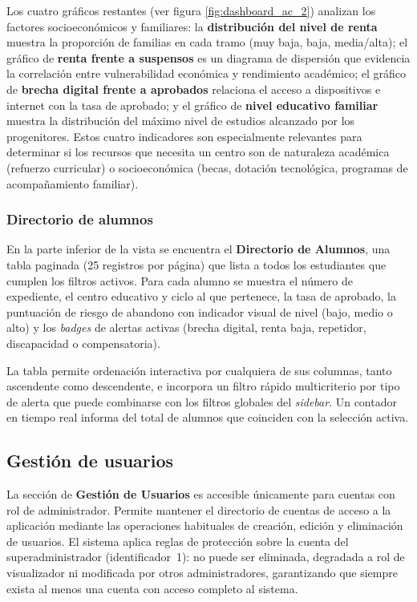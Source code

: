 Los cuatro gráficos restantes (ver figura \ref{fig:dashboard_ac_2}) analizan los factores socioeconómicos y familiares: la \textbf{distribución del nivel de renta} muestra la proporción de familias en cada tramo (muy baja, baja, media/alta); el gráfico de \textbf{renta frente a suspensos} es un diagrama de dispersión que evidencia la correlación entre vulnerabilidad económica y rendimiento académico; el gráfico de \textbf{brecha digital frente a aprobados} relaciona el acceso a dispositivos e internet con la tasa de aprobado; y el gráfico de \textbf{nivel educativo familiar} muestra la distribución del máximo nivel de estudios alcanzado por los progenitores. Estos cuatro indicadores son especialmente relevantes para determinar si los recursos que necesita un centro son de naturaleza académica (refuerzo curricular) o socioeconómica (becas, dotación tecnológica, programas de acompañamiento familiar).

\subsubsection{Directorio de alumnos}

En la parte inferior de la vista se encuentra el \textbf{Directorio de Alumnos}, una tabla paginada (25 registros por página) que lista a todos los estudiantes que cumplen los filtros activos. Para cada alumno se muestra el número de expediente, el centro educativo y ciclo al que pertenece, la tasa de aprobado, la puntuación de riesgo de abandono con indicador visual de nivel (bajo, medio o alto) y los \textit{badges} de alertas activas (brecha digital, renta baja, repetidor, discapacidad o compensatoria).

La tabla permite ordenación interactiva por cualquiera de sus columnas, tanto ascendente como descendente, e incorpora un filtro rápido multicriterio por tipo de alerta que puede combinarse con los filtros globales del \textit{sidebar}. Un contador en tiempo real informa del total de alumnos que coinciden con la selección activa.

\subsection{Gestión de usuarios}

La sección de \textbf{Gestión de Usuarios} es accesible únicamente para cuentas con rol de administrador. Permite mantener el directorio de cuentas de acceso a la aplicación mediante las operaciones habituales de creación, edición y eliminación de usuarios. El sistema aplica reglas de protección sobre la cuenta del superadministrador (identificador~1): no puede ser eliminada, degradada a rol de visualizador ni modificada por otros administradores, garantizando que siempre exista al menos una cuenta con acceso completo al sistema.

